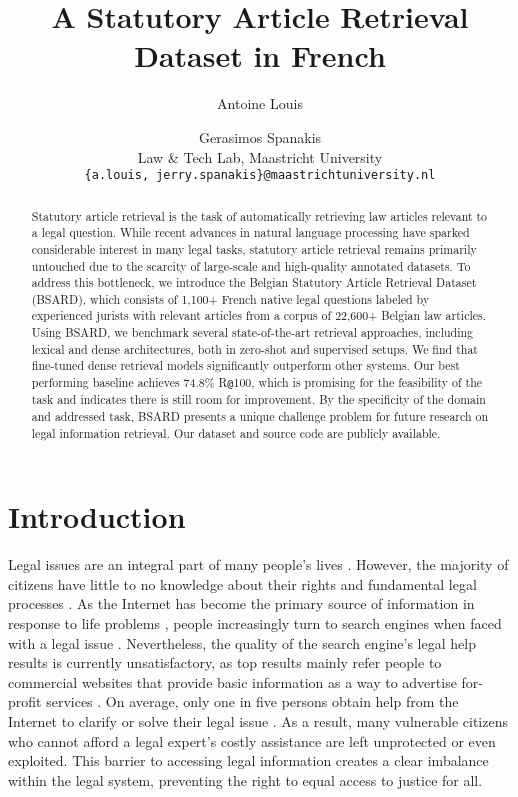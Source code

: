 \documentclass[11pt]{article}
\title{A Statutory Article Retrieval Dataset in French}
\author{Antoine Louis \and Gerasimos Spanakis \\
    Law \& Tech Lab, Maastricht University \\
    {\small \texttt{\{a.louis, jerry.spanakis\}@maastrichtuniversity.nl}} \\
}
\makeatletter
\newcommand{\at}{\texttt{@}}
\makeatother
\begin{document}
\maketitle


\begin{abstract}
  Statutory article retrieval is the task of automatically retrieving law articles relevant to a legal question. While recent advances in natural language processing have sparked considerable interest in many legal tasks, statutory article retrieval remains primarily untouched due to the scarcity of large-scale and high-quality annotated datasets. To address this bottleneck, we introduce the Belgian Statutory Article Retrieval Dataset (BSARD), which consists of 1,100+ French native legal questions labeled by experienced jurists with relevant articles from a corpus of 22,600+ Belgian law articles. Using BSARD, we benchmark several state-of-the-art retrieval approaches, including lexical and dense architectures, both in zero-shot and supervised setups. We find that fine-tuned dense retrieval models significantly outperform other systems. Our best performing baseline achieves 74.8\% R\at100, which is promising for the feasibility of the task and indicates there is still room for improvement. By the specificity of the domain and addressed task, BSARD presents a unique challenge problem for future research on legal information retrieval. Our dataset and source code are publicly available.
\end{abstract}

\section{Introduction \label{sec:introduction}}
Legal issues are an integral part of many people’s lives \citep{long2019global}. However, the majority of citizens have little to no knowledge about their rights and fundamental legal processes \citep{balmer2010knowledge}. As the Internet has become the primary source of information in response to life problems \citep{estabrook2007information}, people increasingly turn to search engines when faced with a legal issue \citep{denvir2016online}. Nevertheless, the quality of the search engine’s legal help results is currently unsatisfactory, as top results mainly refer people to commercial websites that provide basic information as a way to advertise for-profit services \citep{hagan2020legal}. On average, only one in five persons obtain help from the Internet to clarify or solve their legal issue \citep{long2019global}. As a result, many vulnerable citizens who cannot afford a legal expert’s costly assistance are left unprotected or even exploited. This barrier to accessing legal information creates a clear imbalance within the legal system, preventing the right to equal access to justice for all. 
\end{document}
